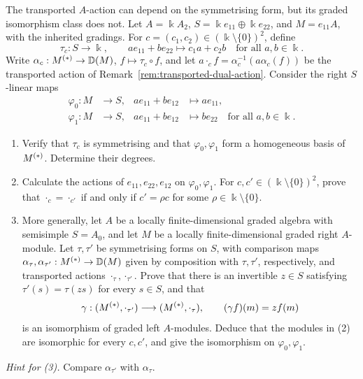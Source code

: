 \begin{advanced}
\begin{exercise}\label{ex:transported-dual-action}
The transported $A$-action can depend on the symmetrising form, but its graded isomorphism class does not.
Let $A=\Bbbk A_2$, $S=\Bbbk e_{11}\oplus\Bbbk e_{22}$, and $M=e_{11}A$, with the inherited gradings.
For $c=(c_1,c_2)\in(\Bbbk\setminus\{0\})^2$, define
\begin{equation}\label{eq:transported-dual-form}
\tau_c:S\longrightarrow\Bbbk,\qquad
a e_{11}+b e_{22}\longmapsto c_1a+c_2b
\quad\text{for all }a,b\in\Bbbk.
\end{equation}
Write $\alpha_c:M^{(*)}\to\mathbb{D}(M)$, $f\mapsto\tau_c\circ f$, and let $a\cdot_c f=\alpha_c^{-1}(a\alpha_c(f))$ be the transported action of Remark~\ref{rem:transported-dual-action}.
Consider the right $S$-linear maps
\begin{equation}\label{eq:transported-dual-functionals}
\begin{aligned}
\varphi_0:M&\longrightarrow S,& a e_{11}+b e_{12}&\longmapsto a e_{11},\\
\varphi_1:M&\longrightarrow S,& a e_{11}+b e_{12}&\longmapsto b e_{22}
\quad\text{for all }a,b\in\Bbbk.
\end{aligned}
\end{equation}
\begin{enumerate}
\item Verify that $\tau_c$ is symmetrising and that $\varphi_0,\varphi_1$ form a homogeneous basis of $M^{(*)}$. Determine their degrees.
\item Calculate the actions of $e_{11},e_{22},e_{12}$ on $\varphi_0,\varphi_1$.
For $c,c'\in(\Bbbk\setminus\{0\})^2$, prove that $\cdot_c=\cdot_{c'}$ if and only if $c'=\rho c$ for some $\rho\in\Bbbk\setminus\{0\}$.
\item More generally, let $A$ be a locally finite-dimensional graded algebra with semisimple $S=A_0$, and let $M$ be a locally finite-dimensional graded right $A$-module.
Let $\tau,\tau'$ be symmetrising forms on $S$, with comparison maps $\alpha_\tau,\alpha_{\tau'}:M^{(*)}\to\mathbb{D}(M)$ given by composition with $\tau,\tau'$, respectively, and transported actions $\cdot_\tau,\cdot_{\tau'}$.
Prove that there is an invertible $z\in S$ satisfying $\tau'(s)=\tau(zs)$ for every $s\in S$, and that
\[
\gamma:(M^{(*)},\cdot_{\tau'})\longrightarrow(M^{(*)},\cdot_\tau),
\qquad (\gamma f)(m)=z f(m)
\]
is an isomorphism of graded left $A$-modules.
Deduce that the modules in (2) are isomorphic for every $c,c'$, and give the isomorphism on $\varphi_0,\varphi_1$.
\end{enumerate}
\emph{Hint for (3).} Compare $\alpha_{\tau'}$ with $\alpha_\tau$.
\end{exercise}


\end{advanced}

